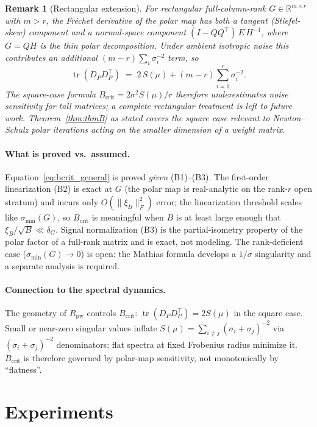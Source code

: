 \documentclass{article}
\newtheorem{remark}{Remark}
\begin{document}
\begin{remark}[Rectangular extension]
\label{rem:rectangular_extension}
For rectangular full-column-rank $G\in\mathbb R^{m\times r}$ with $m>r$, the Fr\'echet derivative of the polar map has both a tangent (Stiefel-skew) component and a normal-space component $(I-QQ^\top)\,E\,H^{-1}$, where $G=QH$ is the thin polar decomposition. Under ambient isotropic noise this contributes an additional $(m-r)\sum_i\sigma_i^{-2}$ term, so
\[
\operatorname{tr}(D_P D_P^\top) \;=\; 2\,S(\mu) + (m-r)\sum_{i=1}^{r}\sigma_i^{-2}.
\]
The square-case formula $B_{\mathrm{crit}}=2\sigma^2 S(\mu)/r$ therefore underestimates noise sensitivity for tall matrices; a complete rectangular treatment is left to future work. Theorem~\ref{thm:thmB} as stated covers the square case relevant to Newton--Schulz polar iterations acting on the smaller dimension of a weight matrix.
\end{remark}

\paragraph{What is proved vs.\ assumed.}
Equation~\eqref{eq:bcrit_general} is proved \emph{given} (B1)--(B3). The first-order linearization (B2) is exact at $G$ (the polar map is real-analytic on the rank-$r$ open stratum) and incurs only $O(\|\xi_B\|_F^2)$ error; the linearization threshold scales like $\sigma_{\min}(G)$, so $B_{\mathrm{crit}}$ is meaningful when $B$ is at least large enough that $\xi_B/\sqrt B \ll \delta_G$. Signal normalization (B3) is the partial-isometry property of the polar factor of a full-rank matrix and is exact, not modeling. The rank-deficient case ($\sigma_{\min}(G)\to 0$) is open: the Mathias formula develops a $1/\sigma$ singularity and a separate analysis is required.

\paragraph{Connection to the spectral dynamics.}
The geometry of $R_{\mathrm{pw}}$ controls $B_{\mathrm{crit}}$: $\operatorname{tr}(D_P D_P^\top)=2S(\mu)$ in the square case. Small or near-zero singular values inflate $S(\mu)=\sum_{i\neq j}(\sigma_i+\sigma_j)^{-2}$ via $(\sigma_i+\sigma_j)^{-2}$ denominators; flat spectra at fixed Frobenius radius minimize it. $B_{\mathrm{crit}}$ is therefore governed by polar-map sensitivity, not monotonically by ``flatness''.

\section{Experiments}
\label{sec:experiments}
\end{document}
